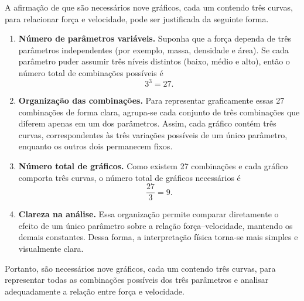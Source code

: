 A afirmação de que são necessários nove gráficos, cada um contendo três curvas,
para relacionar força e velocidade, pode ser justificada da seguinte forma.

\begin{enumerate}
    \item \textbf{Número de parâmetros variáveis.}
    Suponha que a força dependa de três parâmetros independentes (por exemplo,
    massa, densidade e área). Se cada parâmetro puder assumir três níveis
    distintos (baixo, médio e alto), então o número total de combinações
    possíveis é
    \[
        3^3 = 27.
    \]

    \item \textbf{Organização das combinações.}
    Para representar graficamente essas 27 combinações de forma clara, agrupa-se
    cada conjunto de três combinações que diferem apenas em um dos parâmetros.
    Assim, cada gráfico contém três curvas, correspondentes às três variações
    possíveis de um único parâmetro, enquanto os outros dois permanecem fixos.

    \item \textbf{Número total de gráficos.}
    Como existem 27 combinações e cada gráfico comporta três curvas, o número
    total de gráficos necessários é
    \[
        \frac{27}{3} = 9.
    \]

    \item \textbf{Clareza na análise.}
    Essa organização permite comparar diretamente o efeito de um único
    parâmetro sobre a relação força–velocidade, mantendo os demais constantes.
    Dessa forma, a interpretação física torna-se mais simples e visualmente
    clara.
\end{enumerate}

Portanto, são necessários nove gráficos, cada um contendo três curvas, para
representar todas as combinações possíveis dos três parâmetros e analisar
adequadamente a relação entre força e velocidade.